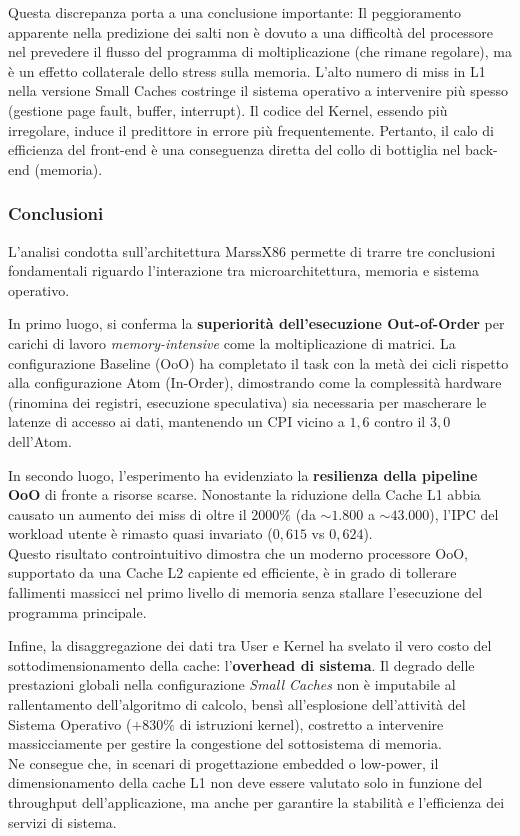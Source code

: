 \documentclass[../../main_document/main.tex]{subfiles}
\begin{document}
\vspace{8pt}
\noindent
Questa discrepanza porta a una conclusione importante: Il peggioramento apparente nella predizione dei salti non è dovuto a una difficoltà del processore nel prevedere il flusso del programma di moltiplicazione (che rimane regolare), ma è un effetto collaterale dello stress sulla memoria. L'alto numero di miss in L1 nella versione Small Caches costringe il sistema operativo a intervenire più spesso (gestione page fault, buffer, interrupt). Il codice del Kernel, essendo più irregolare, induce il predittore in errore più frequentemente. Pertanto, il calo di efficienza del front-end è una conseguenza diretta del collo di bottiglia nel back-end (memoria).

\subsubsection{Conclusioni} 
L'analisi condotta sull'architettura MarssX86 permette di trarre tre conclusioni fondamentali riguardo l'interazione tra microarchitettura, memoria e sistema operativo.

\vspace{8pt}
\noindent
In primo luogo, si conferma la \textbf{superiorità dell'esecuzione Out-of-Order} per carichi di lavoro \textit{memory-intensive} come la moltiplicazione di matrici. La configurazione Baseline (OoO) ha completato il task con la metà dei cicli rispetto alla configurazione Atom (In-Order), dimostrando come la complessità hardware (rinomina dei registri, esecuzione speculativa) sia necessaria per mascherare le latenze di accesso ai dati, mantenendo un CPI vicino a $1,6$ contro il $3,0$ dell'Atom.

\vspace{8pt}
\noindent
In secondo luogo, l'esperimento ha evidenziato la \textbf{resilienza della pipeline OoO} di fronte a risorse scarse. Nonostante la riduzione della Cache L1 abbia causato un aumento dei miss di oltre il $2000\%$ (da $\sim1.800$ a $\sim43.000$), l'IPC del workload utente è rimasto quasi invariato ($0,615$ vs $0,624$).\\
Questo risultato controintuitivo dimostra che un moderno processore OoO, supportato da una Cache L2 capiente ed efficiente, è in grado di tollerare fallimenti massicci nel primo livello di memoria senza stallare l'esecuzione del programma principale.

\vspace{8pt}
\noindent
Infine, la disaggregazione dei dati tra User e Kernel ha svelato il vero costo del sottodimensionamento della cache: l'\textbf{overhead di sistema}. Il degrado delle prestazioni globali nella configurazione \textit{Small Caches} non è imputabile al rallentamento dell'algoritmo di calcolo, bensì all'esplosione dell'attività del Sistema Operativo ($+830\%$ di istruzioni kernel), costretto a intervenire massicciamente per gestire la congestione del sottosistema di memoria.\\
Ne consegue che, in scenari di progettazione embedded o low-power, il dimensionamento della cache L1 non deve essere valutato solo in funzione del throughput dell'applicazione, ma anche per garantire la stabilità e l'efficienza dei servizi di sistema.
\end{document}
